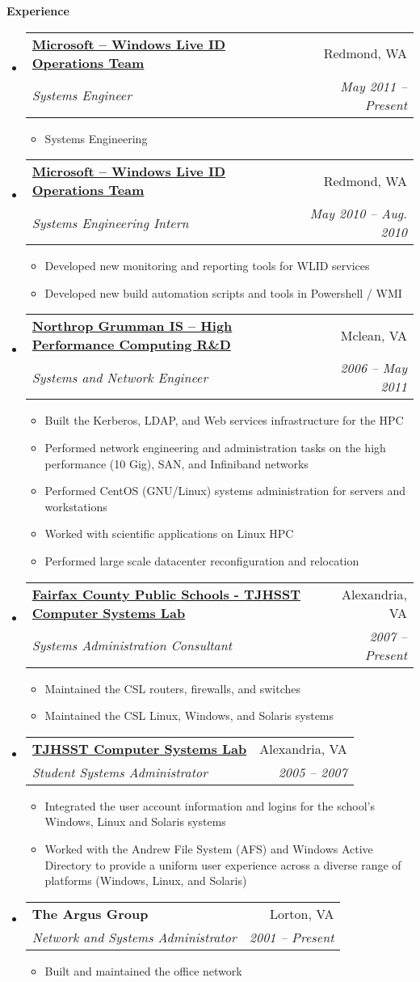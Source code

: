 \documentclass[letterpaper,11pt]{article}
\makeatletter
\newcommand{\resitem}[1]{\item #1 \vspace{-2pt}}
\newcommand{\resheading}[1]{{\large \colorbox{mygrey}{\begin{minipage}{\textwidth}{\textbf{#1 \vphantom{p\^{E}}}}\end{minipage}}}}
\newcommand{\ressubheading}[4]{
\begin{tabular*}{6.5in}{l@{\extracolsep{\fill}}r}
		\textbf{#1} & #2 \\
		\textit{#3} & \textit{#4} \\
\end{tabular*}\vspace{-6pt}}
\makeatother
\begin{document}
\resheading{Experience}
	\begin{itemize}
		\item 
			\ressubheading{\href{http://www.microsoft.com}{Microsoft -- Windows Live ID Operations Team}}{Redmond, WA}{Systems Engineer}{May 2011 -- Present}
				{ \footnotesize
				\begin{itemize}
					\resitem{Systems Engineering}
				\end{itemize}
				}
		\item 
			\ressubheading{\href{http://www.microsoft.com}{Microsoft -- Windows Live ID Operations Team}}{Redmond, WA}{Systems Engineering Intern}{May 2010 -- Aug. 2010}
				{ \footnotesize
				\begin{itemize}
					\resitem{Developed new monitoring and reporting tools for WLID services}
					\resitem{Developed new build automation scripts and tools in Powershell / WMI}
				\end{itemize}
				}
		\item 
			\ressubheading{\href{http://www.northropgrumman.com}{Northrop Grumman IS -- High Performance Computing R\&D}}{Mclean, VA}{Systems and Network Engineer}{2006 -- May 2011}
				{ \footnotesize
				\begin{itemize}
					\resitem{Built the Kerberos, LDAP, and Web services infrastructure for the HPC}
					\resitem{Performed network engineering and administration tasks on the high performance (10 Gig), SAN, and Infiniband networks}
					\resitem{Performed CentOS (GNU/Linux) systems administration for servers and workstations}
					\resitem{Worked with scientific applications on Linux HPC}
					\resitem{Performed large scale datacenter reconfiguration and relocation}
				\end{itemize}
				}
		\item
			\ressubheading{\href{http://www.tjhsst.edu}{Fairfax County Public Schools - TJHSST Computer Systems Lab}}{Alexandria, VA}{Systems Administration Consultant}{2007 -- Present}
				{ \footnotesize
				\begin{itemize}
					\resitem{Maintained the CSL routers, firewalls, and switches}
					\resitem{Maintained the CSL Linux, Windows, and Solaris systems}
				\end{itemize}
				}
		\item
			\ressubheading{\href{http://www.tjhsst.edu}{TJHSST Computer Systems Lab}}{Alexandria, VA}{Student Systems Administrator}{2005 -- 2007}
				{ \footnotesize
				\begin{itemize}
					\resitem{Integrated the user account information and logins for the school's Windows, Linux and Solaris systems}
					\resitem{Worked with the Andrew File System (AFS) and Windows Active Directory to provide a uniform user experience across a diverse range of platforms  (Windows, Linux, and Solaris)}
				\end{itemize}
				}
		\item
			\ressubheading{The Argus Group}{Lorton, VA}{Network and Systems Administrator}{2001 -- Present}
				{ \footnotesize
				\begin{itemize}
					\resitem{Built and maintained the office network}
				\end{itemize}
				}


\end{itemize}
\end{document}
